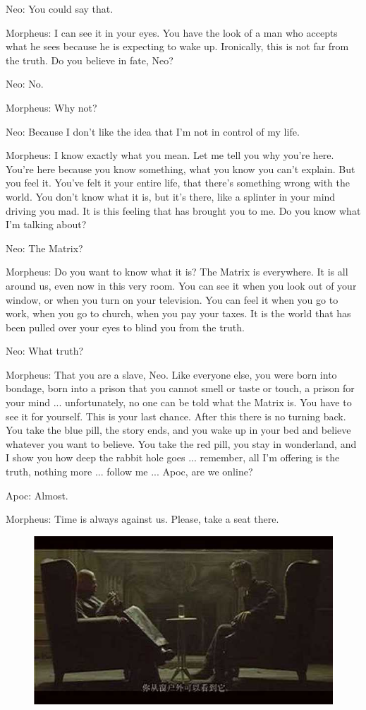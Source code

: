\documentclass[UTF8]{ctexart}
\newenvironment{myquote}{\color{green} \setlength{\leftskip}{6em} \setlength{\rightskip}{4em} \setlength{\parindent}{-2em}}{\par}
\begin{document}
\begin{myquote}
Neo: You could say that.

Morpheus: I can see it in your eyes. You have the look of a man who accepts what he sees because he is expecting to wake up. Ironically, this is not far from the truth. Do you believe in fate, Neo?

Neo: No.

Morpheus: Why not?

Neo: Because I don't like the idea that I'm not in control of my life.

Morpheus: I know exactly what you mean. Let me tell you why you're here. You're here because you know something, what you know you can't explain. But you feel it. You've felt it your entire life, that there's something wrong with the world. You don't know what it is, but it's there, like a splinter in your mind driving you mad. It is this feeling that has brought you to me. Do you know what I'm talking about?

Neo: The Matrix?

Morpheus: Do you want to know what it is? The Matrix is everywhere. It is all around us, even now in this very room. You can see it when you look out of your window, or when you turn on your television. You can feel it when you go to work, when you go to church, when you pay your taxes. It is the world that has been pulled over your eyes to blind you from the truth.

Neo: What truth?

Morpheus: That you are a slave, Neo. Like everyone else, you were born into bondage, born into a prison that you cannot smell or taste or touch, a prison for your mind ... unfortunately, no one can be told what the Matrix is. You have to see it for yourself. This is your last chance. After this there is no turning back. You take the blue pill, the story ends, and you wake up in your bed and believe whatever you want to believe. You take the red pill, you stay in wonderland, and I show you how deep the rabbit hole goes ... remember, all I'm offering is the truth, nothing more ... follow me ... Apoc, are we online?

Apoc: Almost.

Morpheus: Time is always against us. Please, take a seat there.
\end{myquote}

\begin{figure}[htb]
\centering
\includegraphics[width=0.5\linewidth]{fig/read_Matrix-18}
\end{figure}
\end{document}

